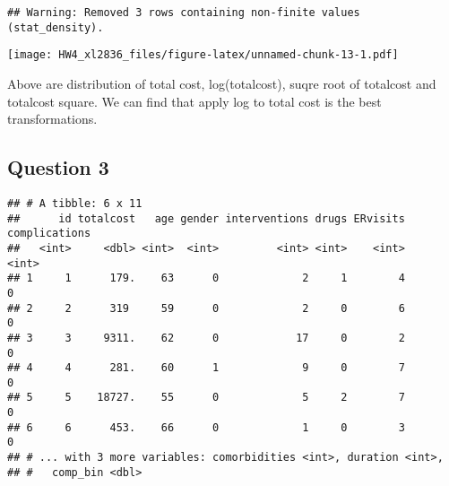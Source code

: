 \documentclass[]{article}
\newenvironment{Shaded}{\begin{snugshade}}{\end{snugshade}}
\newcommand{\KeywordTok}[1]{\textcolor[rgb]{0.13,0.29,0.53}{\textbf{#1}}}
\newcommand{\DataTypeTok}[1]{\textcolor[rgb]{0.13,0.29,0.53}{#1}}
\newcommand{\DecValTok}[1]{\textcolor[rgb]{0.00,0.00,0.81}{#1}}
\newcommand{\FloatTok}[1]{\textcolor[rgb]{0.00,0.00,0.81}{#1}}
\newcommand{\StringTok}[1]{\textcolor[rgb]{0.31,0.60,0.02}{#1}}
\newcommand{\OperatorTok}[1]{\textcolor[rgb]{0.81,0.36,0.00}{\textbf{#1}}}
\newcommand{\NormalTok}[1]{#1}
\begin{document}
\begin{verbatim}
## Warning: Removed 3 rows containing non-finite values (stat_density).
\end{verbatim}

\texttt{[image: HW4\_xl2836\_files/figure-latex/unnamed-chunk-13-1.pdf]}

Above are distribution of total cost, log(totalcost), suqre root of
totalcost and totalcost square. We can find that apply log to total cost
is the best transformations.

\subsection{Question 3}\label{question-3-1}

\begin{Shaded}
\end{Shaded}

\begin{verbatim}
## # A tibble: 6 x 11
##      id totalcost   age gender interventions drugs ERvisits complications
##   <int>     <dbl> <int>  <int>         <int> <int>    <int>         <int>
## 1     1      179.    63      0             2     1        4             0
## 2     2      319     59      0             2     0        6             0
## 3     3     9311.    62      0            17     0        2             0
## 4     4      281.    60      1             9     0        7             0
## 5     5    18727.    55      0             5     2        7             0
## 6     6      453.    66      0             1     0        3             0
## # ... with 3 more variables: comorbidities <int>, duration <int>,
## #   comp_bin <dbl>
\end{verbatim}
\end{document}
